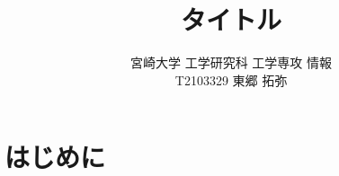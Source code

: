 \documentclass[a4j, uplatex, fleqn, dvipdfmx]{jsarticle} %
\title{\vspace{-1.5cm}タイトル}
\author{宮崎大学 工学研究科 工学専攻 情報\\T2103329 東郷 拓弥}
\begin{document}
\maketitle

\section{はじめに}




\end{document}
